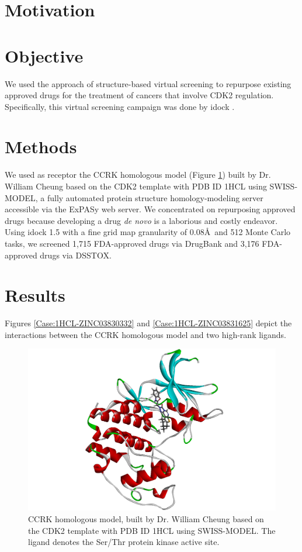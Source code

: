 \section{Motivation}



\section{Objective}

We used the approach of structure-based virtual screening to repurpose existing approved drugs for the treatment of cancers that involve CDK2 regulation. Specifically, this virtual screening campaign was done by idock \citep{1153}.

\section{Methods}

We used as receptor the CCRK homologous model (Figure \ref{Case:CCRKHomologousModel}) built by Dr. William Cheung based on the CDK2 template with PDB ID 1HCL \citep{1142} using SWISS-MODEL, a fully automated protein structure homology-modeling server accessible via the ExPASy web server. We concentrated on repurposing approved drugs \citep{944,1023} because developing a drug \textit{de novo} is a laborious and costly endeavor. Using idock 1.5 with a fine grid map granularity of 0.08\AA\ and 512 Monte Carlo tasks, we screened 1,715 FDA-approved drugs via DrugBank and 3,176 FDA-approved drugs via DSSTOX.

\section{Results}

Figures \ref{Case:1HCL-ZINC03830332} and \ref{Case:1HCL-ZINC03831625} depict the interactions between the CCRK homologous model and two high-rank ligands.

\begin{figure}
\centering
\includegraphics[width=\linewidth]{../ccrk/CCRKHomologousModel.png}
\caption{CCRK homologous model, built by Dr. William Cheung based on the CDK2 template with PDB ID 1HCL \citep{1142} using SWISS-MODEL. The ligand denotes the Ser/Thr protein kinase active site.}
\label{Case:CCRKHomologousModel}
\end{figure}


